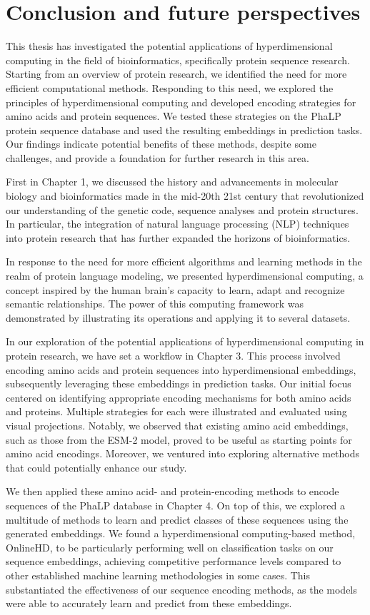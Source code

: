 \chapter{Conclusion and future perspectives}
This thesis has investigated the potential applications of hyperdimensional computing in the field of bioinformatics, specifically protein sequence research. Starting from an overview of protein research, we identified the need for more efficient computational methods. Responding to this need, we explored the principles of hyperdimensional computing and developed encoding strategies for amino acids and protein sequences. We tested these strategies on the PhaLP protein sequence database and used the resulting embeddings in prediction tasks. Our findings indicate potential benefits of these methods, despite some challenges, and provide a foundation for further research in this area.

First in Chapter 1, we discussed the history and advancements in molecular biology and bioinformatics made in the mid-20th 21st century that revolutionized our understanding of the genetic code, sequence analyses and protein structures. In particular, the integration of natural language processing (NLP) techniques into protein research that has further expanded the horizons of bioinformatics.

In response to the need for more efficient algorithms and learning methods in the realm of protein language modeling, we presented hyperdimensional computing, a concept inspired by the human brain's capacity to learn, adapt and recognize semantic relationships. The power of this computing framework was demonstrated by illustrating its operations and applying it to several datasets.

In our exploration of the potential applications of hyperdimensional computing in protein research, we have set a workflow in Chapter 3. This process involved encoding amino acids and protein sequences into hyperdimensional embeddings, subsequently leveraging these embeddings in prediction tasks. Our initial focus centered on identifying appropriate encoding mechanisms for both amino acids and proteins. Multiple strategies for each were illustrated and evaluated using visual projections. Notably, we observed that existing amino acid embeddings, such as those from the \mbox{ESM-2} model, proved to be useful as starting points for amino acid encodings. Moreover, we ventured into exploring alternative methods that could potentially enhance our study.

We then applied these amino acid- and protein-encoding methods to encode sequences of the PhaLP database in Chapter 4. On top of this, we explored a multitude of methods to learn and predict classes of these sequences using the generated embeddings. We found a hyperdimensional computing-based method, OnlineHD, to be particularly performing well on classification tasks on our sequence embeddings, achieving competitive performance levels compared to other established machine learning methodologies in some cases. This substantiated the effectiveness of our sequence encoding methods, as the models were able to accurately learn and predict from these embeddings.

